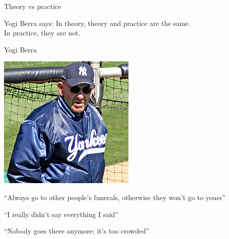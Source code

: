 \begin{frame}{Theory vs practice}
\begin{block}{Yogi Berra says:}
In theory, theory and practice are the same. \\
In practice, they are not.
\end{block}

\pause
\begin{block}{Yogi Berra}
\begin{minipage}{0.20\textwidth}
\includegraphics[width=\textwidth]{figs/01/yogi.jpg}
\end{minipage}
\begin{minipage}{0.75\textwidth}
\BI
\item “Always go to other people's funerals, otherwise they won't go to yours”
\item “I really didn't say everything I said”
\item “Nobody goes there anymore; it's too crowded”
\EI
\end{minipage}
\end{block}	

\end{frame}


